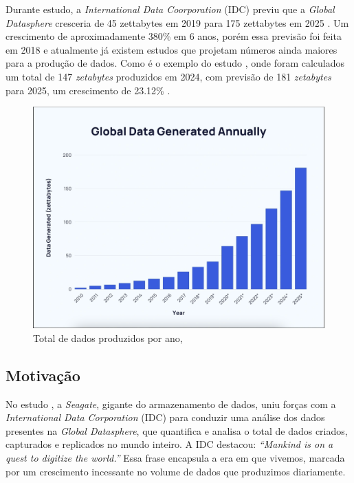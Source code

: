 \documentclass[a4paper, 12pt]{article}
\newcommand{\citeb}[1]{\bibleftbracket\cite{#1}\bibrightbracket}
\begin{document}
    Durante estudo, a \textit{International Data Coorporation} (IDC) previu que a \textit{Global Datasphere} cresceria de 45 zettabytes em 2019 para 175 zettabytes em 2025 \citeb{digitization}. Um crescimento de aproximadamente 380\% em 6 anos, porém essa previsão foi feita em 2018 e atualmente já existem estudos que projetam números ainda maiores para a produção de dados. Como é o exemplo do estudo , onde foram calculados um total de 147 \textit{zetabytes} produzidos em 2024, com previsão de 181 \textit{zetabytes} para 2025, um crescimento de 23.12\% \citeb{data_created}.

    \begin{figure}[h]
        \label{fig:total_dados_anual}
        \includegraphics[width=\textwidth,height=0.9\textheight,keepaspectratio]{global-data-generated-annually-fabio-duarte.png}
        \centering
        \caption{Total de dados produzidos por ano, \citeb{data_created}}
        \centering
    \end{figure}        

    \subsection{Motivação}

    No estudo , a \textit{Seagate}, gigante do armazenamento de dados, uniu forças com a \textit{International Data Corporation} (IDC) para conduzir uma análise dos dados presentes na \textit{Global Datasphere}, que quantifica e analisa o total de dados criados, capturados e replicados no mundo inteiro. A IDC destacou: \textit{“Mankind is on a quest to digitize the world.”} Essa frase encapsula a era em que vivemos, marcada por um crescimento incessante no volume de dados que produzimos diariamente.
    
\end{document}

